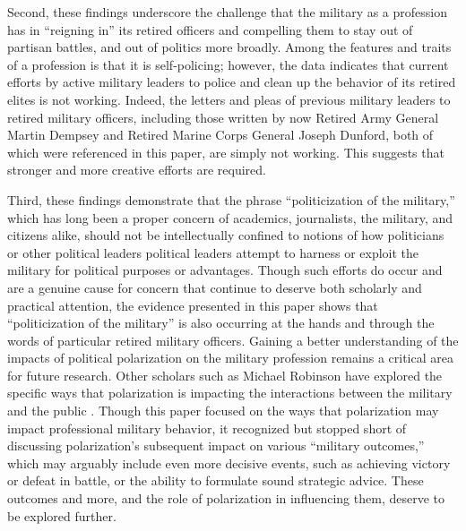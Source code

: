 \documentclass[12pt,]{article}
\begin{document}
Second, these findings underscore the challenge that the military as a profession has in ``reigning in'' its retired officers and compelling them to stay out of partisan battles, and out of politics more broadly. Among the features and traits of a profession is that it is self-policing; however, the data indicates that current efforts by active military leaders to police and clean up the behavior of its retired elites is not working. Indeed, the letters and pleas of previous military leaders to retired military officers, including those written by now Retired Army General Martin Dempsey and Retired Marine Corps General Joseph Dunford, both of which were referenced in this paper, are simply not working. This suggests that stronger and more creative efforts are required.

Third, these findings demonstrate that the phrase ``politicization of the military,'' which has long been a proper concern of academics, journalists, the military, and citizens alike, should not be intellectually confined to notions of how politicians or other political leaders political leaders attempt to harness or exploit the military for political purposes or advantages. Though such efforts do occur and are a genuine cause for concern that continue to deserve both scholarly and practical attention, the evidence presented in this paper shows that ``politicization of the military'' is also occurring at the hands and through the words of particular retired military officers. Gaining a better understanding of the impacts of political polarization on the military profession remains a critical area for future research. Other scholars such as Michael Robinson have explored the specific ways that polarization is impacting the interactions between the military and the public \autocite{robinson_michael_danger_2018}. Though this paper focused on the ways that polarization may impact professional military behavior, it recognized but stopped short of discussing polarization's subsequent impact on various ``military outcomes,'' which may arguably include even more decisive events, such as achieving victory or defeat in battle, or the ability to formulate sound strategic advice. These outcomes and more, and the role of polarization in influencing them, deserve to be explored further.
\end{document}
